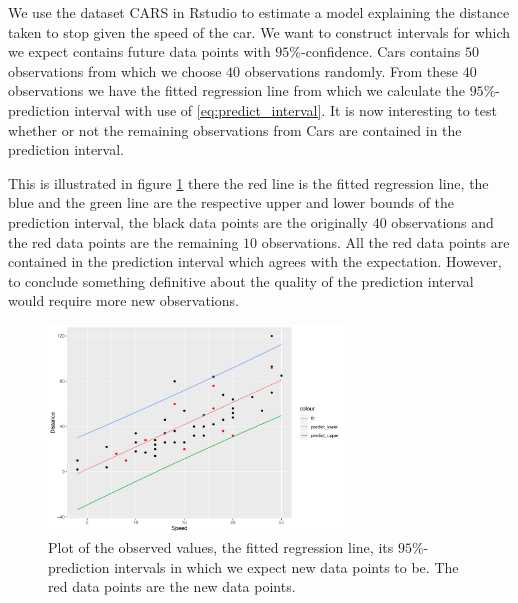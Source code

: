 \begin{example} 
We use the dataset CARS in Rstudio to estimate a model explaining the distance taken to stop given the speed of the car. 
We want to construct intervals for which we expect contains future data points with $95\%$-confidence. 
Cars contains $50$ observations from which we choose $40$ observations randomly. 
From these $40$ observations we have the fitted regression line from which we calculate the $95\%$-prediction interval with use of \eqref{eq:predict_interval}. 
It is now interesting to test whether or not the remaining observations from Cars are contained in the prediction interval. 

This is illustrated in figure \ref{fig:prediction} there the red line is the fitted regression line, the blue and the green line are the respective upper and lower bounds of the prediction interval, the black data points are the originally $40$ observations and the red data points are the remaining $10$ observations. 
All the red data points are contained in the prediction interval 
which agrees with the expectation. 
However, to conclude something definitive about the quality of the prediction interval would require more new observations.
\begin{figure}[H]
    \centering
    \includegraphics[width = 0.7\textwidth]{figures/Nanna/Prediction_plot.pdf}
    \caption{Plot of the observed values, the fitted regression line, its $95\%$-prediction intervals in which we expect new data points to be. The red data points are the new data points.}
    \label{fig:prediction}
\end{figure}



\end{example}



